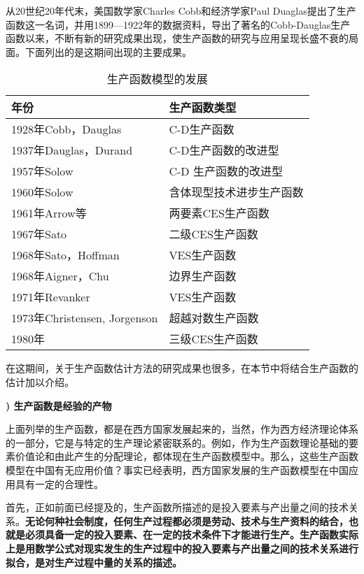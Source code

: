 从20世纪20年代末，美国数学家Charles Cobb和经济学家Paul Duaglas提出了生产函数这一名词，并用1899—1922年的数据资料，导出了著名的Cobb-Dauglas生产函数以来，不断有新的研究成果出现，使生产函数的研究与应用呈现长盛不衰的局面。下面列出的是这期间出现的主要成果。
\begin{table}[htbp]
	\centering
	\caption{生产函数模型的发展}
	\setlength{\tabcolsep}{3em}
	\begin{tabular}{ll}
		\toprule
		年份				& 生产函数类型             \\
		\midrule
		1928年Cobb，Dauglas				& C-D生产函数              \\
		1937年Dauglas，Durand			& C-D生产函数的改进型       \\
		1957年Solow					 & C-D 生产函数的改进型       \\
		1960年Solow				 	 & 含体现型技术进步生产函数   \\
		1961年Arrow等					& 两要素CES生产函数         \\
		1967年Sato						 & 二级CES生产函数           \\
		1968年Sato，Hoffman			    & VES生产函数               \\
		1968年Aigner，Chu				& 边界生产函数			  \\
		1971年Revanker					 & VES生产函数				 \\
		1973年Christensen, Jorgenson	 & 超越对数生产函数           \\
		1980年							 & 三级CES生产函数    \\
		\bottomrule
	\end{tabular}
\end{table}

在这期间，关于生产函数估计方法的研究成果也很多，在本节中将结合生产函数的估计加以介绍。

{\bf {}) 生产函数是经验的产物}
			
上面列举的生产函数，都是在西方国家发展起来的，当然，作为西方经济理论体系的一部分，它是与特定的生产理论紧密联系的。例如，作为生产函数理论基础的要素价值论和由此产生的分配理论，都体现在生产函数模型中。那么，这些生产函数模型在中国有无应用价值？事实已经表明，西方国家发展的生产函数模型在中国应用具有一定的合理性。
			
首先，正如前面已经提及的，生产函数所描述的是投入要素与产出量之间的技术关系。{\bf 无论何种社会制度，任何生产过程都必须是劳动、技术与生产资料的结合，也就是必须具备一定的投入要素、在一定的技术条件下才能进行生产。生产函数实际上是用数学公式对现实发生的生产过程中的投入要素与产出量之间的技术关系进行拟合，是对生产过程中量的关系的描述。}
			
